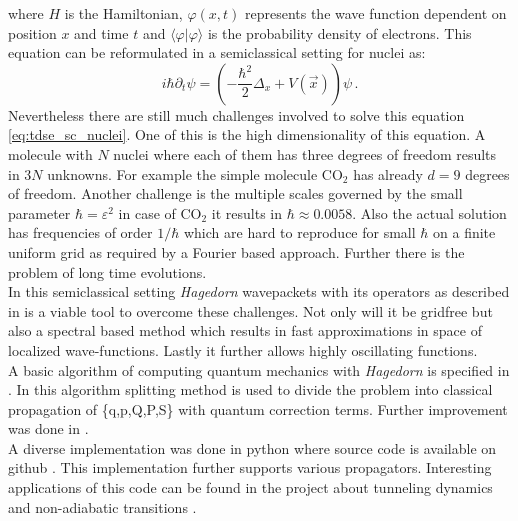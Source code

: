 where $H$ is the Hamiltonian, $\varphi(x,t)$ represents the wave function dependent on position $x$ and
time $t$ and $\langle \varphi | \varphi  \rangle$ is the probability density of electrons. This equation can be reformulated in a semiclassical setting for nuclei as: \
\begin{equation}
\label{eq:tdse_sc_nuclei}
 i\hbar \partial_{t}\psi = \left( -\frac{\hbar^{2}}{2} \Delta_{x} + V(\vec{x}) \right) \psi\,.
\end{equation}
Nevertheless there are still much challenges involved to solve this equation \ref{eq:tdse_sc_nuclei}. One of this is the high dimensionality of this equation. A molecule with $N$ nuclei where each of them has three degrees of freedom results in $3N$ unknowns. For example the simple molecule $\mathrm{CO_{2}}$ has already $d=9$ degrees of freedom. Another challenge is the multiple scales governed by the small parameter $\hbar = \varepsilon^{2}$ in case of $\mathrm{CO_{2}}$ it results in $\hbar \approx 0.0058$. Also the actual solution has frequencies of order $1/\hbar$ which are hard to reproduce for small $\hbar$ on a finite uniform grid as required by a Fourier based approach. Further there is the problem of long time evolutions.\\

In this semiclassical setting \textit{Hagedorn} wavepackets with its operators as described in \cite{H_ladder_operators} is a viable tool to overcome these challenges. Not only will it be gridfree but also a spectral based method which results in fast approximations in space of localized wave-functions. Lastly it further allows highly oscillating functions.\\


A basic algorithm of computing quantum mechanics with \textit{Hagedorn} is specified in \cite{FGL_semiclassical_dynamics}. In this algorithm splitting method is used to divide the problem into classical propagation of \{q,p,Q,P,S\} with quantum correction terms.
Further improvement was done in \cite{GH_convsemiclassical}.\\

A diverse implementation was done in python \cite{B_master_thesis} where source code is available on github \cite{waveblocksnd}. This implementation further supports various propagators. Interesting applications of this code can be found in the project about tunneling dynamics \cite{GHJ_tunneling_spawning} and non-adiabatic transitions \cite{BGH_natac}.\\

